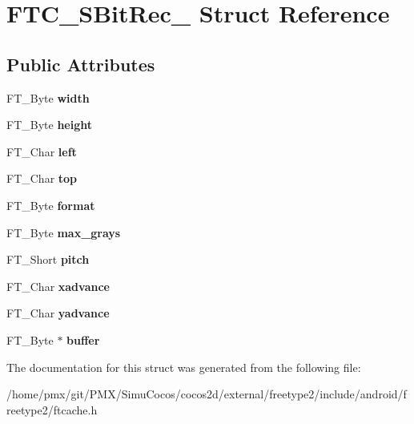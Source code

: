 \hypertarget{structFTC__SBitRec__}{}\section{F\+T\+C\+\_\+\+S\+Bit\+Rec\+\_\+ Struct Reference}
\label{structFTC__SBitRec__}
\subsection*{Public Attributes}
\begin{DoxyCompactItemize}
\item 
\mbox{\label{structFTC__SBitRec___a5b92fb4f213a880f758bb87ac2ceb263}} 
F\+T\+\_\+\+Byte {\bfseries width}
\item 
\mbox{\label{structFTC__SBitRec___a5953efe2aded3b184875d5e5d08cafef}} 
F\+T\+\_\+\+Byte {\bfseries height}
\item 
\mbox{\label{structFTC__SBitRec___aef273749f4fdb9943500ec6df8412a94}} 
F\+T\+\_\+\+Char {\bfseries left}
\item 
\mbox{\label{structFTC__SBitRec___a3e558b3a04b70f00f80b862cdc94d9a2}} 
F\+T\+\_\+\+Char {\bfseries top}
\item 
\mbox{\label{structFTC__SBitRec___a3d3fcc2869ce5c95f0f63898e6cef8be}} 
F\+T\+\_\+\+Byte {\bfseries format}
\item 
\mbox{\label{structFTC__SBitRec___a83958d4649a898312de9a7274550dff9}} 
F\+T\+\_\+\+Byte {\bfseries max\+\_\+grays}
\item 
\mbox{\label{structFTC__SBitRec___a1382ec014df599e706c2c1785bc18235}} 
F\+T\+\_\+\+Short {\bfseries pitch}
\item 
\mbox{\label{structFTC__SBitRec___a502a0bb69d973d2ae626a842eb9fefd3}} 
F\+T\+\_\+\+Char {\bfseries xadvance}
\item 
\mbox{\label{structFTC__SBitRec___aabe767ddaf7ff62918886c6f62e9ac28}} 
F\+T\+\_\+\+Char {\bfseries yadvance}
\item 
\mbox{\label{structFTC__SBitRec___af4a1b95acb1acfb035b41808b6b7ca1c}} 
F\+T\+\_\+\+Byte $\ast$ {\bfseries buffer}
\end{DoxyCompactItemize}


The documentation for this struct was generated from the following file\+:\begin{DoxyCompactItemize}
\item 
/home/pmx/git/\+P\+M\+X/\+Simu\+Cocos/cocos2d/external/freetype2/include/android/freetype2/ftcache.\+h\end{DoxyCompactItemize}
